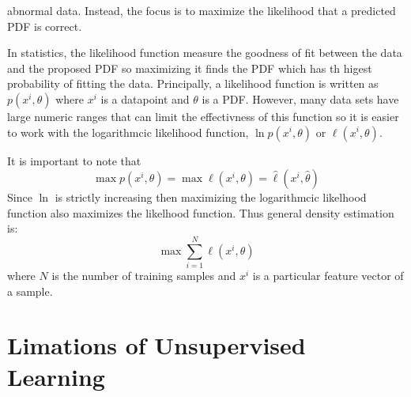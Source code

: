 \documentclass[10pt,a4paper]{report}
\begin{document}
					abnormal data. Instead, the focus is to maximize the likelihood that a predicted PDF is correct. \par
					In statistics, the likelihood function measure the goodness of fit between the data and the proposed PDF so maximizing it finds the PDF which
					has th higest probability of fitting the data.
					Principally, a likelihood function is written as $p(x^i,\theta)$ where $x^i$ is a datapoint and $\theta$ is a PDF.
					However, many data sets have large  numeric ranges that can limit the effectivness of this function so it is easier to work with the
					logarithmcic likelihood function, $\ln p(x^i,\theta)$ or $\ell(x^i,\theta)$. \par
					It is important to note that
					\begin{equation}
						\max p(x^i,\theta) = \max \ell(x^i,\theta) = \widehat{\ell}(x^i, \widehat{\theta})
					\end{equation}
					Since $\ln$ is strictly increasing then maximizing the logarithmcic likelhood function also maximizes the likelhood function. Thus general density estimation \autocite[p. 4]{SurveyOfOptimizationMethods} is:
					\begin{equation}
						\max \sum_{i=1}^N \ell(x^i,\theta)
					\end{equation}
					where $N$ is the number of training samples and $x^i$ is a particular feature vector of a sample.

			\section{Limations of Unsupervised Learning}
\end{document}
